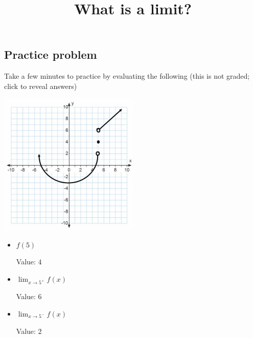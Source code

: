 \documentclass{ximera}
\title{What is a limit?}
\begin{document}
\subsection{Practice problem}

Take a few minutes to practice by evaluating the following (this is not graded; click to reveal answers)

\includegraphics[width=0.5\textwidth]{graph2.png}

\begin{itemize}
    \item $f(5)$
    \begin{expandable}
        Value: $4$
    \end{expandable}
    \item $\lim_{x\to5^+} f(x)$
    \begin{foldable}
        Value: $6$
    \end{foldable}
    \item $\lim_{x\to5^-} f(x)$
    \begin{expandable}
        Value: $2$
    \end{expandable}
\end{itemize}
\end{document}
